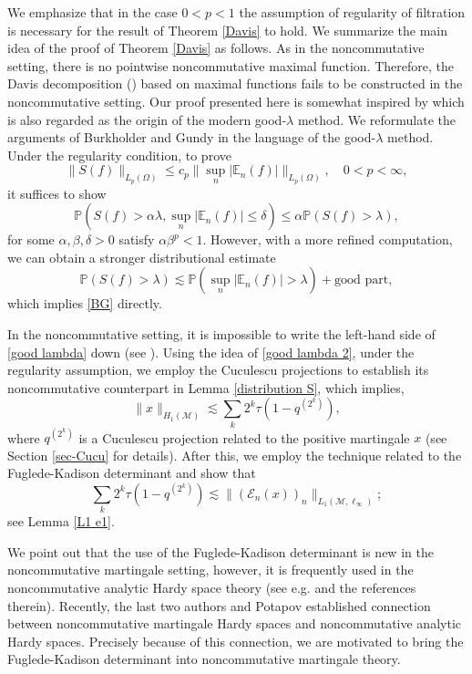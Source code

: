 \documentclass[11]{amsart}
\numberwithin{equation}{section}
\newcommand{\M}{\mathcal{M}}
\begin{document}
We emphasize that in the case $0<p<1$ the assumption of regularity of filtration is necessary for the result of Theorem \ref{Davis} to hold.
We summarize the main idea of the proof of Theorem \ref{Davis} as follows. 
	As in the noncommutative setting, there is no pointwise noncommutative maximal function. Therefore, the Davis decomposition (\cite{Da1970}) based on maximal functions fails to be constructed in the noncommutative setting. Our proof presented here is somewhat inspired by \cite{BG1970} which is also regarded as the origin of the modern good-$\lambda$ method. We reformulate the arguments of Burkholder and Gundy in the language of the good-$\lambda$ method. Under the regularity condition, to prove 
	\begin{equation}\label{BG}
\|S(f)\|_{L_p(\Omega)}\leq c_p \|\sup_n|\mathbb{E}_n(f)|\|_{L_p(\Omega)} ,\quad 0<p<\infty,
	\end{equation}
	it suffices to show 
	\begin{equation}\label{good lambda}
		\mathbb{P}(S(f)>\alpha \lambda, \sup_n|\mathbb{E}_n(f)|\leq \delta)\leq \alpha \mathbb{P}(S(f)>\lambda),
	\end{equation}
	for some $\alpha,\beta,\delta>0$ satisfy $\alpha\beta^p<1$. However, with a more refined computation, we can obtain a stronger distributional estimate
	\begin{equation}\label{good lambda 2}
		\mathbb{P}(S(f)> \lambda)\lesssim  \mathbb{P}(\sup_n|\mathbb{E}_n(f)|>\lambda)+\mbox{good part},
	\end{equation}
	which implies \eqref{BG} directly. 
	
	In the noncommutative setting, it is impossible to write the left-hand side of \eqref{good lambda} down (see \cite{JOW2025}).
	Using the idea of \eqref{good lambda 2}, under the regularity assumption, we employ the Cuculescu projections to establish its noncommutative counterpart in Lemma \ref{distribution S}, which implies, 
	$$\|x\|_{H_1(\M)}\lesssim \sum_k 2^k\tau(1-q^{(2^k)}),$$
	where $q^{(2^k)}$ is a Cuculescu projection related to the positive martingale $x$ (see Section \ref{sec-Cucu} for details).  After this, we employ the technique related to the Fuglede-Kadison determinant and show that
	\begin{equation}\label{FK lem}
		\sum_k 2^k\tau(1-q^{(2^k)}) \lesssim \|(\mathcal{
		E}_n(x))_n\|_{L_1(\mathcal{M},\ell_{\infty})};
	\end{equation}
	see Lemma \ref{L1 e1}. 


 We point out that the use of the  Fuglede-Kadison determinant is new in the noncommutative martingale setting, however, it is frequently used in the noncommutative analytic Hardy space theory (see e.g. \cite{BL2008} and the references therein).  Recently, the last two authors and Potapov \cite{PSZ2024} established connection between noncommutative martingale Hardy spaces and noncommutative analytic Hardy spaces. Precisely because of this connection, we are motivated to bring the Fuglede-Kadison determinant into noncommutative martingale theory. 
 
\end{document}
